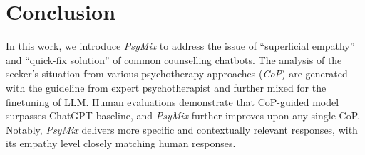 \section{Conclusion}
\label{sec:conclusion}

In this work, we introduce \textit{PsyMix} to address the issue of ``superficial empathy'' and ``quick-fix solution'' of common counselling chatbots. The analysis of the seeker’s situation from various psychotherapy approaches (\textit{CoP}) are generated with the guideline from expert psychotherapist and further mixed for the finetuning of LLM. Human evaluations demonstrate that CoP-guided model surpasses ChatGPT baseline, and \textit{PsyMix} further improves upon any single CoP. Notably, \textit{PsyMix} delivers more specific and contextually relevant responses, with its empathy level closely matching human responses.